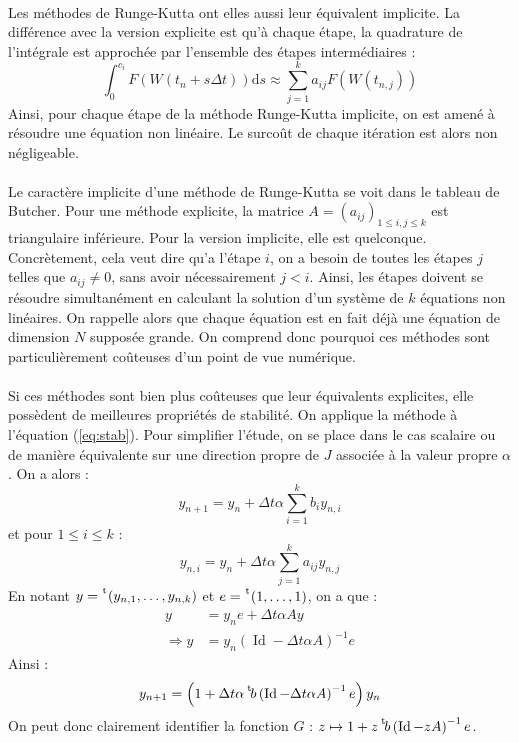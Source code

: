     \paragraph{}
    Les méthodes de Runge-Kutta ont elles aussi leur équivalent implicite.
    La différence avec la version explicite est qu'à chaque étape, la quadrature de l'intégrale est approchée par l'ensemble des étapes intermédiaires :
    \[\int_0^{c_i}F\left(W\left(t_n + s\Delta t\right)\right)\mathrm{d}s \approx \sum_{j = 1}^ka_{ij}F\left(W\left(t_{n,j}\right)\right)\]
    Ainsi, pour chaque étape de la méthode Runge-Kutta implicite, on est amené à résoudre une équation non linéaire.
    Le surcoût de chaque itération est alors non négligeable.

    \paragraph{}
    Le caractère implicite d'une méthode de Runge-Kutta se voit dans le tableau de Butcher.
    Pour une méthode explicite, la matrice $A = \left(a_{ij}\right)_{1\leq i, j\leq k}$ est triangulaire inférieure.
    Pour la version implicite, elle est quelconque.
    Concrètement, cela veut dire qu'a l'étape $i$, on a besoin de toutes les étapes $j$ telles que $a_{ij}\neq 0$, sans avoir nécessairement $j < i$.
    Ainsi, les étapes doivent se résoudre simultanément en calculant la solution d'un système de $k$ équations non linéaires.
    On rappelle alors que chaque équation est en fait déjà une équation de dimension $N$ supposée grande.
    On comprend donc pourquoi ces méthodes sont particulièrement coûteuses d'un point de vue numérique.

    \paragraph{}
    Si ces méthodes sont bien plus coûteuses que leur équivalents explicites, elle possèdent de meilleures propriétés de stabilité.
    On applique la méthode à l'équation (\ref{eq:stab}).
    Pour simplifier l'étude, on se place dans le cas scalaire ou de manière équivalente sur une direction propre de $J$ associée à la valeur propre $\alpha$.
    On a alors :
    \[y_{n+1} = y_n + \Delta t\alpha \sum_{i = 1}^k b_iy_{n,i}\]
    et pour $1\leq i\leq k$ :
    \[y_{n,i} = y_n + \Delta t\alpha \sum_{j = 1}^k a_{ij}y_{n,j}\]
    En notant $y = \mskip1mu\prescript{\smash{\mathrm t\mkern-3mu}}{}{\mathstrut\left(y_{n,1}, \dots, y_{n,k}\right)}$ et $e = \mskip1mu\prescript{\smash{\mathrm t\mkern-3mu}}{}{\mathstrut\left(1, \dots, 1\right)}$, on a que :
    \begin{align*}
      y &= y_ne + \Delta t\alpha Ay \\
      \Rightarrow y &= y_n\left(\operatorname{Id} - \Delta t\alpha A\right)^{-1}e
    \end{align*}
    Ainsi :
    \[y_{n+1} = \left(1 + \Delta t\alpha\mskip1mu\prescript{\smash{\mathrm t\mkern-3mu}}{}{\mathstrut b}\left(\operatorname{Id} - \Delta t\alpha A\right)^{-1}e\right)y_n\]
    On peut donc clairement identifier la fonction $G$ : $z \mapsto 1 + z\mskip1mu\prescript{\smash{\mathrm t\mkern-3mu}}{}{\mathstrut b}\left(\operatorname{Id} - zA\right)^{-1}e$.
